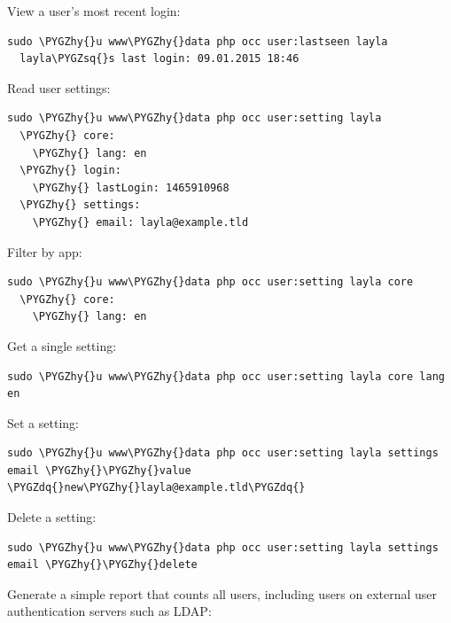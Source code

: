 \documentclass[letterpaper,10pt,english]{sphinxmanual}
\def\PYGZhy{\char`\-}
\def\PYGZsq{\char`\'}
\def\PYGZdq{\char`\"}
\renewcommand\PYGZsq{\textquotesingle}
\begin{document}
View a user's most recent login:

\begin{Verbatim}[commandchars=\\\{\}]
sudo \PYGZhy{}u www\PYGZhy{}data php occ user:lastseen layla
  layla\PYGZsq{}s last login: 09.01.2015 18:46
\end{Verbatim}

Read user settings:

\begin{Verbatim}[commandchars=\\\{\}]
sudo \PYGZhy{}u www\PYGZhy{}data php occ user:setting layla
  \PYGZhy{} core:
    \PYGZhy{} lang: en
  \PYGZhy{} login:
    \PYGZhy{} lastLogin: 1465910968
  \PYGZhy{} settings:
    \PYGZhy{} email: layla@example.tld
\end{Verbatim}

Filter by app:

\begin{Verbatim}[commandchars=\\\{\}]
sudo \PYGZhy{}u www\PYGZhy{}data php occ user:setting layla core
  \PYGZhy{} core:
    \PYGZhy{} lang: en
\end{Verbatim}

Get a single setting:

\begin{Verbatim}[commandchars=\\\{\}]
sudo \PYGZhy{}u www\PYGZhy{}data php occ user:setting layla core lang
en
\end{Verbatim}

Set a setting:

\begin{Verbatim}[commandchars=\\\{\}]
sudo \PYGZhy{}u www\PYGZhy{}data php occ user:setting layla settings email \PYGZhy{}\PYGZhy{}value \PYGZdq{}new\PYGZhy{}layla@example.tld\PYGZdq{}
\end{Verbatim}

Delete a setting:

\begin{Verbatim}[commandchars=\\\{\}]
sudo \PYGZhy{}u www\PYGZhy{}data php occ user:setting layla settings email \PYGZhy{}\PYGZhy{}delete
\end{Verbatim}

Generate a simple report that counts all users, including users on external user
authentication servers such as LDAP:
\end{document}

